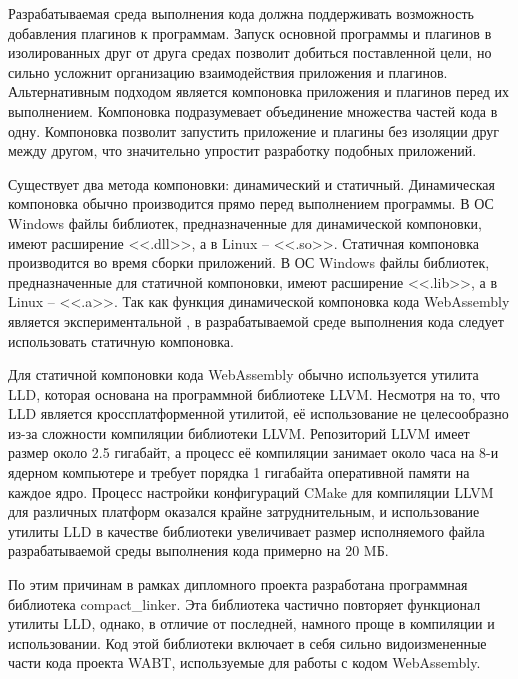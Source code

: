Разрабатываемая среда выполнения кода должна поддерживать возможность добавления плагинов к программам.
Запуск основной программы и плагинов в изолированных друг от друга средах позволит добиться поставленной цели, но сильно усложнит организацию взаимодействия приложения и плагинов.
Альтернативным подходом является компоновка приложения и плагинов перед их выполнением.
Компоновка подразумевает объединение множества частей кода в одну.
Компоновка позволит запустить приложение и плагины без изоляции друг между другом, что значительно упростит разработку подобных приложений.

Существует два метода компоновки: динамический и статичный.
Динамическая компоновка обычно производится прямо перед выполнением программы.
В ОС Windows файлы библиотек, предназначенные для динамической компоновки, имеют расширение <<.dll>>, а в Linux -- <<.so>>.
Статичная компоновка производится во время сборки приложений.
В ОС Windows файлы библиотек, предназначенные для статичной компоновки, имеют расширение <<.lib>>, а в Linux -- <<.a>>.
Так как функция динамической компоновка кода WebAssembly является экспериментальной \cite{WASMDynamicLinking}, в разрабатываемой среде выполнения кода следует использовать статичную компоновка.

Для статичной компоновки кода WebAssembly обычно используется утилита LLD, которая основана на программной библиотеке LLVM.
Несмотря на то, что LLD является кроссплатформенной утилитой, её использование не целесообразно из-за сложности компиляции библиотеки LLVM.
Репозиторий LLVM имеет размер около 2.5 гигабайт, а процесс её компиляции занимает около часа на 8-и ядерном компьютере и требует порядка 1 гигабайта оперативной памяти на каждое ядро.
Процесс настройки конфигураций CMake для компиляции LLVM для различных платформ оказался крайне затруднительным, и использование утилиты LLD в качестве библиотеки увеличивает размер исполняемого файла разрабатываемой среды выполнения кода примерно на 20 MБ.

По этим причинам в рамках дипломного проекта разработана программная библиотека compact\_linker. 
Эта библиотека частично повторяет функционал утилиты LLD, однако, в отличие от последней, намного проще в компиляции и использовании.
Код этой библиотеки включает в себя сильно видоизмененные части кода проекта WABT, используемые для работы с кодом WebAssembly.
